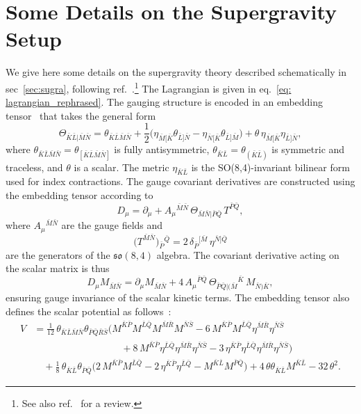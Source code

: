 \documentclass[11pt,a4paper]{article}
\newcommand{\bK}{{\bar{K}}}
\newcommand{\bL}{{\bar{L}}}
\newcommand{\bM}{{\bar{M}}}
\newcommand{\bN}{{\bar{N}}}
\newcommand{\bP}{{\bar{P}}}
\newcommand{\bQ}{{\bar{Q}}}
\newcommand{\bR}{{\bar{R}}}
\newcommand{\bS}{{\bar{S}}}
\begin{document}
\appendix
\section{Some Details on the Supergravity Setup} \label{app:sugra}
We give here some details on the supergravity theory described schematically in sec~\ref{sec:sugra}, following ref.~\cite{Nicolai:2001ac,deWit:2003ja}.\footnote{See also ref.~\cite{Eloy:2021qol} for a review.} The Lagrangian is given in eq.~\eqref{eq: lagrangian_rephrased}. The gauging structure is encoded in an embedding tensor~\cite{Nicolai:2000sc,deWit:2002vt} that takes the general form
%
\begin{equation}	\label{eq: embtensor_rephrased}
	\Theta_{\bK\bL\vert\bM\bN}=\theta_{\bK\bL\bM\bN}+\frac12\Big(\eta_{\bM[\bK}\theta_{\bL]\bN}-\eta_{\bN[\bK}\theta_{\bL]\bM}\Big)+\theta\,\eta_{\bM[\bK}\eta_{\bL]\bN},
\end{equation}
%
where $\theta_{\bK\bL\bM\bN}=\theta_{[\bK\bL\bM\bN]}$ is fully antisymmetric, $\theta_{\bK\bL}=\theta_{(\bK\bL)}$ is symmetric and traceless, and $\theta$ is a scalar. The metric $\eta_{\bK\bL}$ is the SO(8,4)-invariant bilinear form used for index contractions. The gauge covariant derivatives are constructed using the embedding tensor according to
%
\begin{equation}
	D_\mu =\partial_\mu + A_\mu{}^{\bM\bN}\,\Theta_{\bM\bN\vert\bP\bQ}\, T^{\bP\bQ},
\end{equation}
%
where $A_\mu{}^{\bM\bN}$ are the gauge fields and
%
\begin{equation} \label{eq:so84gen_rephrased}
	\big(T^{\bar M\bar N}\big){}_{\bar P}{}^{\bar Q} = 2\,\delta_{\bar P}{}^{[\bar M}\,\eta^{\bar N]\bar Q}
\end{equation}
%
are the generators of the $\mathfrak{so}(8,4)$ algebra. The covariant derivative acting on the scalar matrix is thus
%
\begin{equation}
	D_\mu M_{\bM\bN}=\partial_\mu M_{\bM\bN}+4\,A_\mu{}^{\bP\bQ}\,\Theta_{\bP\bQ\vert(\bM}{}^{\bK}\, M_{\bN)\bK},
\end{equation}
%
ensuring gauge invariance of the scalar kinetic terms. The embedding tensor also defines the scalar potential as follows~\cite{Samtleben:2019zrh,Schon:2006kz}:
%
{\setlength\arraycolsep{1.2pt}
	\begin{equation}	\label{eq: scalarpot_rephrased}
		\begin{aligned}
			V	&=	\frac1{12}\,\theta_{\bK\bL\bM\bN}\theta_{\bP\bQ\bR\bS}\Big(M^{\bK\bP}M^{\bL\bQ}M^{\bM\bR}M^{\bN\bS}-6\,M^{\bK\bP}M^{\bL\bQ}\eta^{\bM\bR}\eta^{\bN\bS}\\
			&\qquad\qquad\qquad\qquad\quad+8\,M^{\bK\bP}\eta^{\bL\bQ}\eta^{\bM\bR}\eta^{\bN\bS}-3\,\eta^{\bK\bP}\eta^{\bL\bQ}\eta^{\bM\bR}\eta^{\bN\bS}\Big)\\
			&\quad +\frac1{8}\,\theta_{\bK\bL}\theta_{\bP\bQ}\Big(2\,M^{\bK\bP}M^{\bL\bQ}-2\,\eta^{\bK\bP}\eta^{\bL\bQ}-M^{\bK\bL}M^{\bP\bQ}\Big)+4\,\theta\theta_{\bK\bL}M^{\bK\bL}-32\,\theta^2.
		\end{aligned}
	\end{equation}
}
\end{document}

